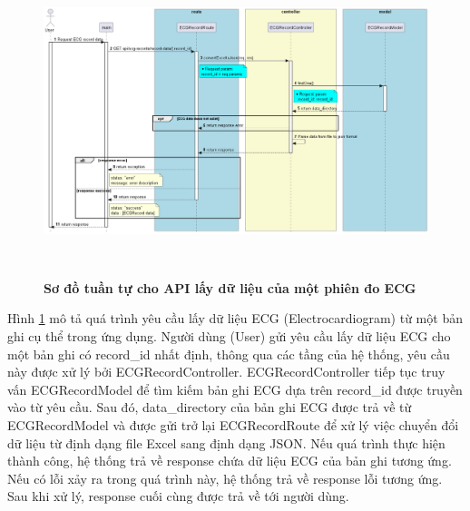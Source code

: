 \begin{figure}[H]
  \centering
  \includegraphics[width=16cm,height=9cm]{Images/server/sequence/server/convertExceltoJson.png}
  \caption[Sơ đồ tuần tự cho API lấy dữ liệu của một phiên đo ECG ]{\bfseries \fontsize{12pt}{0pt}
  \selectfont Sơ đồ tuần tự cho API lấy dữ liệu của một phiên đo ECG  }
  \label{convertExceltoJson} %
\end{figure}
Hình \ref{convertExceltoJson} mô tả quá trình yêu cầu lấy dữ liệu ECG (Electrocardiogram) từ một bản ghi cụ thể trong ứng dụng. Người dùng (User) gửi yêu cầu lấy dữ liệu ECG cho một bản ghi có record\_id nhất định, thông qua các tầng của hệ thống, yêu cầu này được xử lý bởi ECGRecordController. ECGRecordController tiếp tục truy vấn ECGRecordModel để tìm kiếm bản ghi ECG dựa trên record\_id được truyền vào từ yêu cầu. Sau đó, data\_directory của bản ghi ECG được trả về từ ECGRecordModel và được gửi trở lại ECGRecordRoute để xử lý việc chuyển đổi dữ liệu từ định dạng file Excel sang định dạng JSON. Nếu quá trình thực hiện thành công, hệ thống trả về response chứa dữ liệu ECG của bản ghi tương ứng. Nếu có lỗi xảy ra trong quá trình này, hệ thống trả về response lỗi tương ứng. Sau khi xử lý, response cuối cùng được trả về tới người dùng.

